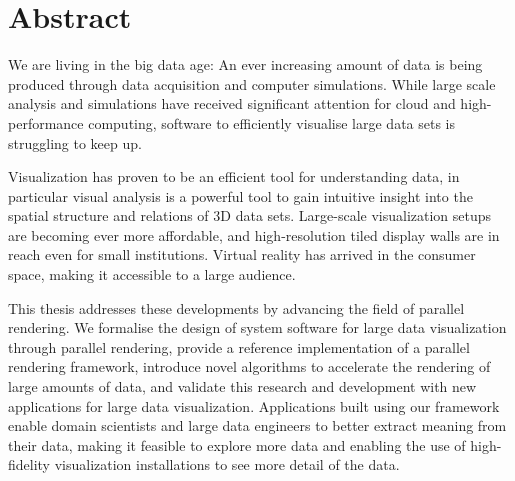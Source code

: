 
\chapter*{Abstract} 

We are living in the big data age: An ever increasing amount of data is being
produced through data acquisition and computer simulations. While large scale
analysis and simulations have received significant attention for cloud and
high-performance computing, software to efficiently visualise large data sets
is struggling to keep up.

Visualization has proven to be an efficient tool for understanding data, in
particular visual analysis is a powerful tool to gain intuitive insight into
the spatial structure and relations of 3D data sets. Large-scale visualization
setups are becoming ever more affordable, and high-resolution tiled display
walls are in reach even for small institutions. Virtual reality has arrived in
the consumer space, making it accessible to a large audience.

This thesis addresses these developments by advancing the field of parallel
rendering. We formalise the design of system software for large data
visualization through parallel rendering, provide a reference implementation of
a parallel rendering framework, introduce novel algorithms to accelerate the
rendering of large amounts of data, and validate this research and development
with new applications for large data visualization. Applications built using
our framework enable domain scientists and large data engineers to better
extract meaning from their data, making it feasible to explore more data and
enabling the use of high-fidelity visualization installations to see more
detail of the data.

